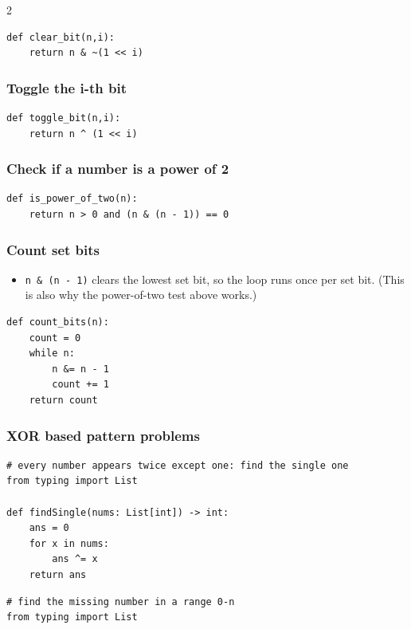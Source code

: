 \documentclass[9pt,a4paper]{extarticle}
\newlength{\tw}
\begin{document}
\begin{multicols}{2}
\begin{lstlisting}
def clear_bit(n,i):
    return n & ~(1 << i)
\end{lstlisting}

\subsubsection{Toggle the i-th bit}

\begin{lstlisting}
def toggle_bit(n,i):
    return n ^ (1 << i)
\end{lstlisting}

\subsubsection{Check if a number is a power of 2}

\begin{lstlisting}
def is_power_of_two(n):
    return n > 0 and (n & (n - 1)) == 0
\end{lstlisting}

\subsubsection{Count set bits}

\begin{itemize}
\item \texttt{n \& (\allowbreak{}n - 1)} clears the lowest set bit, so the loop runs once per set bit. (This is also why the power-of-two test above works.)
\end{itemize}

\begin{lstlisting}
def count_bits(n):
    count = 0
    while n:
        n &= n - 1
        count += 1
    return count
\end{lstlisting}

\subsubsection{XOR based pattern problems}

\begin{lstlisting}
# every number appears twice except one: find the single one
from typing import List

def findSingle(nums: List[int]) -> int:
    ans = 0
    for x in nums:
        ans ^= x
    return ans
\end{lstlisting}

\begin{lstlisting}
# find the missing number in a range 0-n
from typing import List


\end{lstlisting}
\end{multicols}
\end{document}
